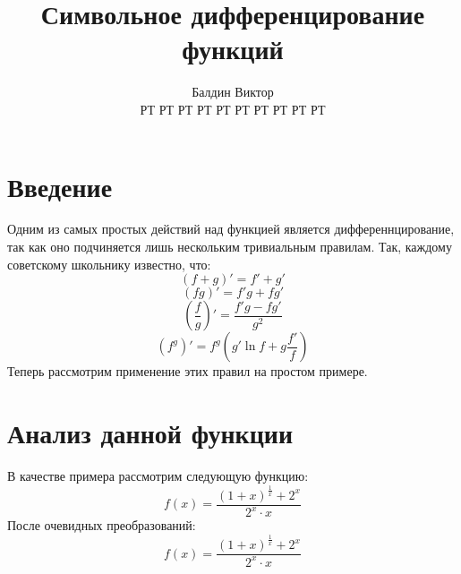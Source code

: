 \documentclass{article}
\title{Символьное дифференцирование функций}
\author{Балдин Виктор\\РТ РТ РТ РТ РТ РТ РТ РТ РТ РТ}
\begin{document}
\maketitle
\section{Введение}
Одним из самых простых действий над функцией является дифференнцирование, так как оно подчиняется лишь нескольким тривиальным правилам. Так, каждому советскому школьнику известно, что:
$$(f+g)'=f'+g'$$
$$(fg)' =f'g+fg'$$
$$\left(\frac{f}{g}\right)'=\frac{f'g-fg'}{g^2}$$
$$(f^g)'=f^g\left(g'\ln f+g\frac{f'}{f}\right)$$Теперь рассмотрим применение этих правил на простом примере.\section{Анализ данной функции}
В качестве примера рассмотрим следующую функцию:
$$f(x)=\frac{\left(1+x\right)^{\frac{1}{x}}+2^{x}}{2^{x} \cdot x}$$
После очевидных преобразований:$$f(x)=\frac{\left(1+x\right)^{\frac{1}{x}}+2^{x}}{2^{x} \cdot x}$$
\end{document}
